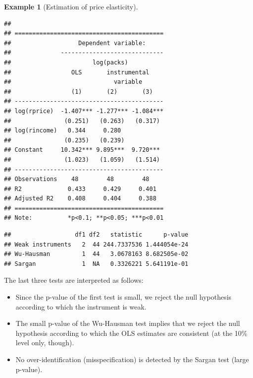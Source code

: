 \documentclass[
  12pt,
]{book}
\newenvironment{Shaded}{\begin{snugshade}}{\end{snugshade}}
\newcommand{\AttributeTok}[1]{\textcolor[rgb]{0.13,0.29,0.53}{#1}}
\newcommand{\ConstantTok}[1]{\textcolor[rgb]{0.56,0.35,0.01}{#1}}
\newcommand{\FunctionTok}[1]{\textcolor[rgb]{0.13,0.29,0.53}{\textbf{#1}}}
\newcommand{\NormalTok}[1]{#1}
\newcommand{\SpecialCharTok}[1]{\textcolor[rgb]{0.81,0.36,0.00}{\textbf{#1}}}
\providecommand{\tightlist}{%
  \setlength{\itemsep}{0pt}\setlength{\parskip}{0pt}}
\theoremstyle{definition}
\theoremstyle{definition}
\newtheorem{example}{Example}[chapter]
\theoremstyle{definition}
\theoremstyle{definition}
\theoremstyle{remark}
\begin{document}
\begin{example}[Estimation of price elasticity]
\begin{verbatim}
## 
## ==========================================
##                   Dependent variable:     
##              -----------------------------
##                       log(packs)          
##                 OLS       instrumental    
##                             variable      
##                 (1)       (2)       (3)   
## ------------------------------------------
## log(rprice)  -1.407*** -1.277*** -1.084***
##               (0.251)   (0.263)   (0.317) 
## log(rincome)   0.344     0.280            
##               (0.235)   (0.239)           
## Constant     10.342*** 9.895***  9.720*** 
##               (1.023)   (1.059)   (1.514) 
## ------------------------------------------
## Observations    48        48        48    
## R2             0.433     0.429     0.401  
## Adjusted R2    0.408     0.404     0.388  
## ==========================================
## Note:          *p<0.1; **p<0.05; ***p<0.01
\end{verbatim}

\begin{Shaded}
\end{Shaded}

\begin{verbatim}
##                  df1 df2   statistic      p-value
## Weak instruments   2  44 244.7337536 1.444054e-24
## Wu-Hausman         1  44   3.0678163 8.682505e-02
## Sargan             1  NA   0.3326221 5.641191e-01
\end{verbatim}

The last three tests are interpreted as follows:

\begin{itemize}
\tightlist
\item
  Since the p-value of the first test is small, we reject the null hypothesis according to which the instrument is weak.
\item
  The small p-value of the Wu-Hausman test implies that we reject the null hypothesis according to which the OLS estimates are consistent (at the 10\% level only, though).
\item
  No over-identification (misspecification) is detected by the Sargan test (large p-value).
\end{itemize}

\end{example}
\end{document}
